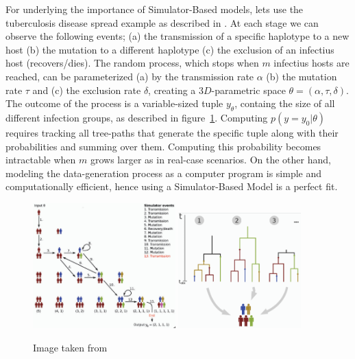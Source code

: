 For underlying the importance of Simulator-Based models, lets use the
tuberculosis disease spread example as described in
\cite{Tanaka2006}. At each stage we can observe the following events;
(a) the transmission of a specific haplotype to a new host (b) the
mutation to a different haplotype (c) the exclusion of an infectius
host (recovers/dies). The random process, which stops when $m$
infectius hosts are reached, can be parameterized (a) by the
transmission rate $\alpha$ (b) the mutation rate $\tau$ and (c) the
exclusion rate $\delta$, creating a $3D$-parametric space
$\theta = (\alpha, \tau, \delta)$. The outcome of the process is a
variable-sized tuple $y_\theta$, containg the size of all different
infection groups, as described in
figure~\ref{fig:tuberculosis_model}. Computing $p(y=y_0|\theta)$
requires tracking all tree-paths that generate the specific tuple
along with their probabilities and summing over them. Computing this
probability becomes intractable when $m$ grows larger as in real-case
scenarios. On the other hand, modeling the data-generation process as
a computer program is simple and computationally efficient, hence
using a Simulator-Based Model is a perfect fit.

\begin{figure}[!ht]
    \begin{center}
      \includegraphics[width=0.49\textwidth]{./images/chapter1/tuber_model_1.png}
      \includegraphics[width=0.42\textwidth]{./images/chapter1/tuber_model_2.png}
    \end{center}
    \caption{Image taken from \cite{Lintusaari2017}}
    \label{fig:tuberculosis_model}
\end{figure}

